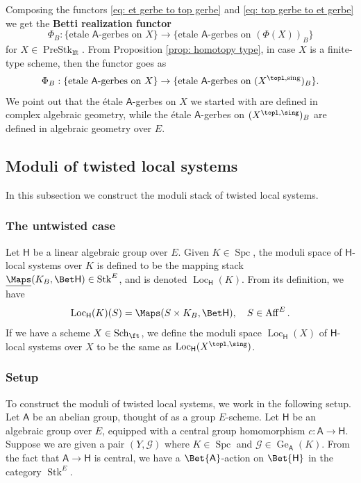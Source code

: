 \documentclass[10pt]{amsart}
\newcommand{\sssec}{\subsubsection}
\theoremstyle{remark}
\newcommand{\ul}{\underline}
\newcommand{\on}{\operatorname}
\newcommand{\cG}{\mathcal{G}}
\newcommand{\Loc}{\on{Loc}}
\newcommand{\PreStklft}{\on{PreStk}_{\on{lft}}}
\newcommand{\Stk}{\on{Stk}}
\newcommand{\Aff}{\on{Aff}}
\newcommand{\Spc}{\on{Spc}}
\newcommand{\sfA}{\mathsf{A}}
\begin{document}
\sssec{}\label{sssec: Betti realization functor}
Composing the functors \eqref{eq: et gerbe to top gerbe} and \eqref{eq: top gerbe to et gerbe} we get the \textbf{Betti realization functor}
\begin{equation}\label{eq: Betti realization}
    \Phi_B: \{\text{etale }\sfA\text{-gerbes on } X\}\rightarrow \{\text{etale }\sfA\text{-gerbes on } (\Phi(X))_B\}
\end{equation}
for $X\in\PreStklft$.
From Proposition \ref{prop: homotopy type}, in case $X$ is a finite-type scheme, then the functor goes as
\begin{equation}\label{eq: Betti realization der sch}
    \Phi_B: \{\text{etale }\sfA\text{-gerbes on } X\}\rightarrow \{\text{etale }\sfA\text{-gerbes on } (X^{\topl, \on{sing}})_B\}.
\end{equation}
We point out that the \'etale $\sfA$-gerbes on $X$ we started with are defined in complex algebraic geometry, while the \'etale $\sfA$-gerbes on $(X^{\topl,\sing})_B$ are defined in algebraic geometry over $E$.




\subsection{Moduli of twisted local systems}\label{ssec: twisted locsys}
In this subsection we construct the moduli stack of twisted local systems.

\sssec{The untwisted case}\label{sssec: untwisted} Let $\mathsf{H}$ be a linear algebraic group over $E$. Given $K\in\Spc$, the moduli space of $\mathsf{H}$-local systems over $K$ is defined to be the mapping stack $\ul{\Maps}(K_B, \Bet \mathsf{H})\in\Stk^E$, and is denoted $\Loc_{\mathsf{H}}(K)$. From its definition, we have
\[\Loc_{\mathsf{H}}(K)(S)=\Maps(S\times K_B, \Bet \mathsf{H}),\quad S\in\Aff^E.\]
If we have a scheme $X\in\on{Sch}_{\ft}$, we define the moduli space $\Loc_{\mathsf{H}}(X)$ of $\mathsf{H}$-local systems over $X$ to be the same as $\Loc_{\mathsf{H}}(X^{\topl,\sing})$.


\sssec{Setup}\label{sssec: BA acts on BH}
To construct the moduli of twisted local systems, we work in the following setup.
Let $\sfA$ be an abelian group, thought of as a group $E$-scheme. Let $\mathsf{H}$ be an algebraic group over $E$, equipped with a central group homomorphism $c:\sfA\rightarrow \mathsf{H}$. Suppose we are given a pair $(Y,\cG)$ where $K\in\Spc$ and $\cG\in \on{Ge}_{\sfA}(K)$.
From the fact that $\sfA\rightarrow \mathsf{H}$ is central, we have a $\Bet{\sfA}$-action on $\Bet{\mathsf{H}}$ in the category $\Stk^E$.
\end{document}
